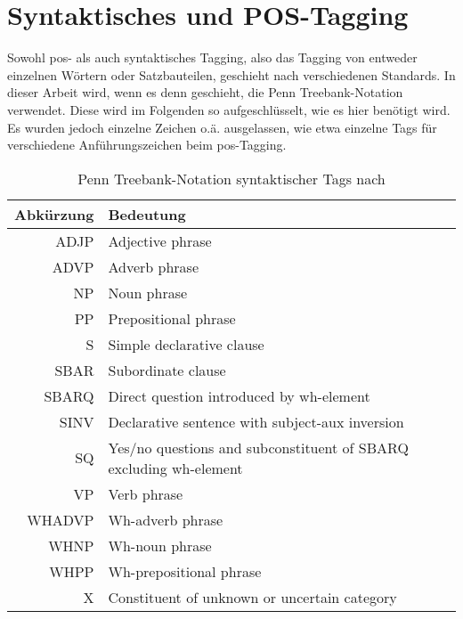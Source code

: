 \chapter{Syntaktisches und POS-Tagging}\label{ch:tagging}

Sowohl \ac{pos}- als auch syntaktisches Tagging, also das Tagging von entweder einzelnen Wörtern oder Satzbauteilen, geschieht nach verschiedenen Standards.
In dieser Arbeit wird, wenn es denn geschieht, die Penn Treebank-Notation verwendet.
Diese wird im Folgenden so aufgeschlüsselt, wie es hier benötigt wird.
Es wurden jedoch einzelne Zeichen o.ä. ausgelassen, wie etwa einzelne Tags für verschiedene Anführungszeichen beim \ac{pos}-Tagging.

\begin{table}[h]\centering
  \begin{tabular}{ r l}
    \toprule
    Abkürzung & Bedeutung \\
    \midrule
    ADJP & Adjective phrase \\
    ADVP & Adverb phrase \\
    NP & Noun phrase \\
    PP & Prepositional phrase \\
    S & Simple declarative clause \\
    SBAR & Subordinate clause \\
    SBARQ & Direct question introduced by wh-element \\
    SINV & Declarative sentence with subject-aux inversion \\
    SQ & Yes/no questions and subconstituent of SBARQ excluding wh-element \\
    VP & Verb phrase \\
    WHADVP & Wh-adverb phrase \\
    WHNP & Wh-noun phrase \\
    WHPP & Wh-prepositional phrase \\
    X & Constituent of unknown or uncertain category \\
    \bottomrule
  \end{tabular}
  \caption{Penn Treebank-Notation syntaktischer Tags nach \citet{penntreebankpos}}
  \label{tab:penntreebanksynt}
\end{table}

